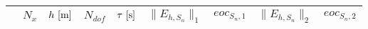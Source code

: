 

%   

\begin{tabular}{rrrrrrcrc}
\toprule

\multicolumn{1}{c}{}
  &  \multicolumn{1}{c}{$ N_x $}
  &  \multicolumn{1}{c}{$ h~[\textup{m}] $}
  &  \multicolumn{1}{c}{$ N_{dof} $}
  &  \multicolumn{1}{c}{$ \tau~[\textup{s}] $}
  &  \multicolumn{1}{c}{$ \lVert E_{h,S_n} \rVert_1 $}
  &  \multicolumn{1}{c}{$ eoc_{S_n,1} $}
  &  \multicolumn{1}{c}{$ \lVert E_{h,S_n} \rVert_2 $}
  &  \multicolumn{1}{c}{$ eoc_{S_n,2} $}
  \\

\midrule


\end{tabular}
